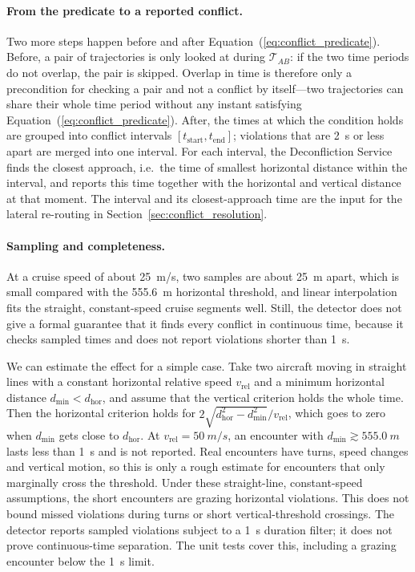 \paragraph{From the predicate to a reported conflict.}
Two more steps happen before and after Equation~(\ref{eq:conflict_predicate}). Before, a pair of trajectories is only looked at during \(\mathcal{T}_{AB}\): if the two time periods do not overlap, the pair is skipped. Overlap in time is therefore only a precondition for checking a pair and not a conflict by itself---two trajectories can share their whole time period without any instant satisfying Equation~(\ref{eq:conflict_predicate}). After, the times at which the condition holds are grouped into conflict intervals \([t_{\text{start}}, t_{\text{end}}]\); violations that are \SI{2}{s} or less apart are merged into one interval. For each interval, the Deconfliction Service finds the closest approach, i.e.\ the time of smallest horizontal distance within the interval, and reports this time together with the horizontal and vertical distance at that moment. The interval and its closest-approach time are the input for the lateral re-routing in Section~\ref{sec:conflict_resolution}.

\paragraph{Sampling and completeness.}
At a cruise speed of about \SI{25}{m/s}, two samples are about \SI{25}{m} apart, which is small compared with the \SI{555.6}{m} horizontal threshold, and linear interpolation fits the straight, constant-speed cruise segments well. Still, the detector does not give a formal guarantee that it finds every conflict in continuous time, because it checks sampled times and does not report violations shorter than \SI{1}{s}.

We can estimate the effect for a simple case. Take two aircraft moving in straight lines with a constant horizontal relative speed \(v_{\mathrm{rel}}\) and a minimum horizontal distance \(d_{\min} < d_{\mathrm{hor}}\), and assume that the vertical criterion holds the whole time. Then the horizontal criterion holds for \(2\sqrt{d_{\mathrm{hor}}^{2} - d_{\min}^{2}}/v_{\mathrm{rel}}\), which goes to zero when \(d_{\min}\) gets close to \(d_{\mathrm{hor}}\). At \(v_{\mathrm{rel}} = \SI{50}{m/s}\), an encounter with \(d_{\min} \gtrsim \SI{555.0}{m}\) lasts less than \SI{1}{s} and is not reported. Real encounters have turns, speed changes and vertical motion, so this is only a rough estimate for encounters that only marginally cross the threshold. Under these straight-line, constant-speed assumptions, the short encounters are grazing horizontal violations. This does not bound missed violations during turns or short vertical-threshold crossings. The detector reports sampled violations subject to a \SI{1}{s} duration filter; it does not prove continuous-time separation. The unit tests cover this, including a grazing encounter below the \SI{1}{s} limit.

